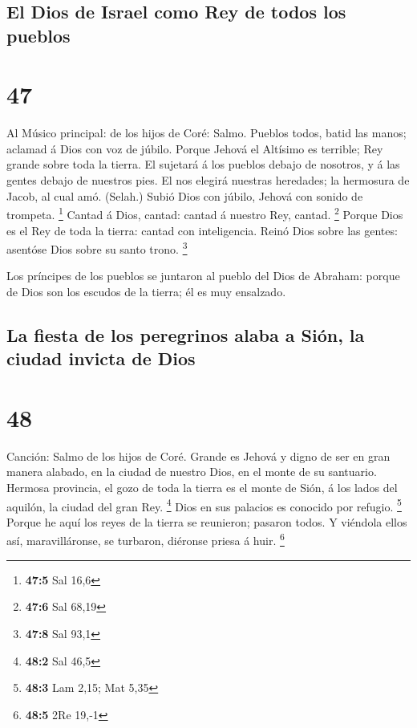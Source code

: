 \hypertarget{el-dios-de-israel-como-rey-de-todos-los-pueblos}{%
\subsection{El Dios de Israel como Rey de todos los
pueblos}\label{el-dios-de-israel-como-rey-de-todos-los-pueblos}}

\hypertarget{section-46}{%
\section{47}\label{section-46}}

 Al Músico principal: de los hijos de Coré: Salmo. Pueblos
todos, batid las manos; aclamad á Dios con voz de júbilo. 
Porque Jehová el Altísimo es terrible; Rey grande sobre toda la tierra.
 El sujetará á los pueblos debajo de nosotros, y á las
gentes debajo de nuestros pies.  El nos elegirá nuestras
heredades; la hermosura de Jacob, al cual amó. (Selah.) 
Subió Dios con júbilo, Jehová con sonido de trompeta. \footnote{\textbf{47:5}
  Sal 16,6}  Cantad á Dios, cantad: cantad á nuestro Rey,
cantad. \footnote{\textbf{47:6} Sal 68,19}  Porque Dios es
el Rey de toda la tierra: cantad con inteligencia.  Reinó
Dios sobre las gentes: asentóse Dios sobre su santo trono. \footnote{\textbf{47:8}
  Sal 93,1}

 Los príncipes de los pueblos se juntaron al pueblo del Dios
de Abraham: porque de Dios son los escudos de la tierra; él es muy
ensalzado.

\hypertarget{la-fiesta-de-los-peregrinos-alaba-a-siuxf3n-la-ciudad-invicta-de-dios}{%
\subsection{La fiesta de los peregrinos alaba a Sión, la ciudad invicta
de
Dios}\label{la-fiesta-de-los-peregrinos-alaba-a-siuxf3n-la-ciudad-invicta-de-dios}}

\hypertarget{section-47}{%
\section{48}\label{section-47}}

 Canción: Salmo de los hijos de Coré. Grande es Jehová y
digno de ser en gran manera alabado, en la ciudad de nuestro Dios, en el
monte de su santuario.  Hermosa provincia, el gozo de toda
la tierra es el monte de Sión, á los lados del aquilón, la ciudad del
gran Rey. \footnote{\textbf{48:2} Sal 46,5}  Dios en sus
palacios es conocido por refugio. \footnote{\textbf{48:3} Lam 2,15; Mat
  5,35}  Porque he aquí los reyes de la tierra se reunieron;
pasaron todos.  Y viéndola ellos así, maravilláronse, se
turbaron, diéronse priesa á huir. \footnote{\textbf{48:5} 2Re 19,-1}

